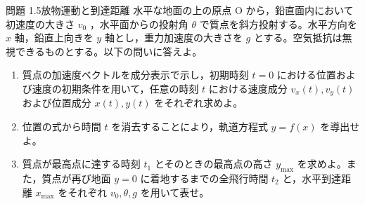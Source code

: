 \problemstart
{}

\begin{problemBox}{問題 1.5\quad 放物運動と到達距離\hspace{1.2em}{\small\mdseries 〔基本〕}}
水平な地面の上の原点 O から，鉛直面内において初速度の大きさ $v_0$ ，水平面からの投射角 $\theta$ で質点を斜方投射する。水平方向を $x$ 軸，鉛直上向きを $y$ 軸とし，重力加速度の大きさを $g$ とする。空気抵抗は無視できるものとする。以下の問いに答えよ。

\begin{enumerate}
  \item 質点の加速度ベクトルを成分表示で示し，初期時刻 $t=0$ における位置および速度の初期条件を用いて，任意の時刻 $t$ における速度成分 $v_x(t), v_y(t)$ および位置成分 $x(t), y(t)$ をそれぞれ求めよ。

  \item 位置の式から時間 $t$ を消去することにより，軌道方程式 $y = f(x)$ を導出せよ。

  \item 質点が最高点に達する時刻 $t_1$ とそのときの最高点の高さ $y_{\text{max}}$ を求めよ。また，質点が再び地面 $y=0$ に着地するまでの全飛行時間 $t_2$ と，水平到達距離 $x_{\text{max}}$ をそれぞれ $v_0, \theta, g$ を用いて表せ。
\end{enumerate}
\end{problemBox}

